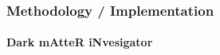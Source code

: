 \documentclass{beamer}
\begin{document}
   \begin{frame}
      \frametitle{Methodology / Implementation}
      \framesubtitle{Dark mAtteR iNvesigator}



\end{frame}
\end{document}

